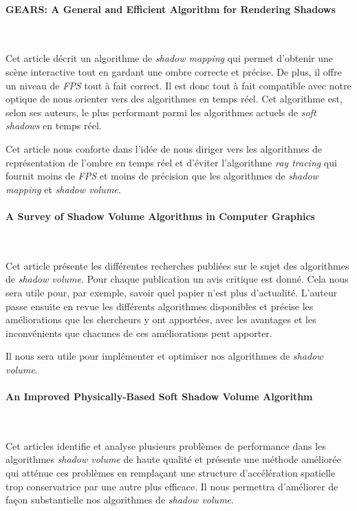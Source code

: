 \documentclass[a4paper,10pt]{report}
\begin{document}
\paragraph{\large GEARS: A General and Efficient Algorithm for Rendering Shadows }
~~\\
\cite{wanggearsalgorithm}

Cet article décrit un algorithme de \textit{shadow mapping} qui permet d'obtenir une scène interactive tout en gardant une ombre correcte et précise. De plus, il offre un niveau de \textit{FPS} tout à fait correct. Il est donc tout à fait compatible avec notre optique de nous orienter vers des algorithmes en temps réel. Cet algorithme est, selon ses auteurs, le plus performant parmi les algorithmes actuels de \textit{soft shadows} en temps réel.

Cet article nous conforte dans l'idée de nous diriger vers les algorithmes de représentation de l'ombre en temps réel et d'éviter l'algorithme \textit{ray tracing} qui fournit moins de \textit{FPS} et moins de précision que les algorithmes de \textit{shadow mapping} et \textit{shadow volume}.


\paragraph{\large A Survey of Shadow Volume Algorithms in Computer Graphics}
~~\\
\cite{shadowvolumesurvey}

Cet article présente les différentes recherches publiées sur le sujet des algorithmes de \textit{shadow volume}. Pour chaque publication un avis critique est donné. Cela nous sera utile pour, par exemple, savoir quel papier n'est plus d'actualité. L'auteur passe ensuite en revue les différents algorithmes disponibles et précise les améliorations que les chercheurs y ont apportées, avec les avantages et les inconvénients que chacunes de ces améliorations peut apporter.

Il nous sera utile pour implémenter et optimiser nos algorithmes de \textit{shadow volume}.


\paragraph{\large An Improved Physically-Based Soft Shadow Volume Algorithm}
~~\\
\cite{shadowvolumeimprovement}

Cet articles identifie et analyse plusieurs problèmes de performance dans les algorithmes \textit{shadow volume} de haute qualité et présente une méthode améliorée qui atténue ces problèmes en remplaçant une structure d'accélération spatielle trop conservatrice par une autre plus efficace.
Il nous permettra d'améliorer de façon substantielle nos algorithmes de \textit{shadow volume}.
\end{document}
